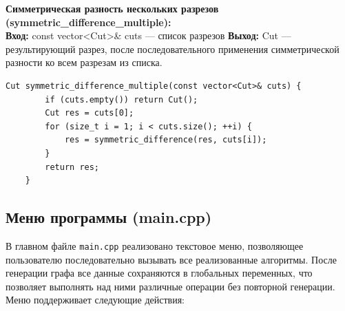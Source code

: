 \noindent\textbf{Симметрическая разность нескольких разрезов (symmetric\_difference\_multiple):} \\
\noindent\textbf{Вход:}
const vector<Cut>\& cuts — список разрезов
\noindent\textbf{Выход:}
Cut — результирующий разрез, после последовательного применения симметрической разности ко всем разрезам из списка.

\begin{lstlisting}[caption=Фундаментальный разрез (cuts.cpp)]
	Cut symmetric_difference_multiple(const vector<Cut>& cuts) {
		if (cuts.empty()) return Cut();
		Cut res = cuts[0];
		for (size_t i = 1; i < cuts.size(); ++i) {
			res = symmetric_difference(res, cuts[i]);
		}
		return res;
	}
\end{lstlisting}

\subsection{Меню программы (main.cpp)}
В главном файле \texttt{main.cpp} реализовано текстовое меню, позволяющее пользователю последовательно вызывать все реализованные алгоритмы. После генерации графа все данные сохраняются в глобальных переменных, что позволяет выполнять над ними различные операции без повторной генерации. Меню поддерживает следующие действия:

